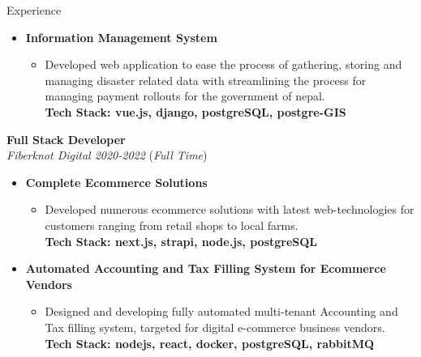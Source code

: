 \documentclass{resume} %
\begin{document}
\begin{rSection}{Experience}
    \begin{itemize}
        \item \textbf{Information Management System}
              \begin{itemize}
                  \item Developed web application to ease the process of gathering, storing and managing disaster related data with streamlining the process for managing payment rollouts for the government of nepal.
                        \\ \footnotesize{\textbf{Tech Stack: vue.js, django, postgreSQL, postgre-GIS }}
              \end{itemize}
    \end{itemize}

    \large{{\bf Full Stack Developer}}
    \\ \small{\textit{Fiberknot Digital 2020-2022}} (\small{\textit{Full Time}})
    \begin{itemize}
        \item \textbf{Complete Ecommerce Solutions}
              \begin{itemize}
                  \item Developed numerous ecommerce solutions with latest web-technologies for customers ranging from retail shops to local farms.
                        \\ \footnotesize{\textbf{Tech Stack: next.js, strapi, node.js, postgreSQL }}
              \end{itemize}
    \end{itemize}

    \begin{itemize}
        \item \textbf{Automated Accounting and Tax Filling System for Ecommerce Vendors}
              \begin{itemize}
                  \item Designed and developing fully automated multi-tenant Accounting and Tax filling system,
                        targeted for digital e-commerce business vendors.
                        \\ \footnotesize{\textbf{Tech Stack: nodejs, react, docker, postgreSQL, rabbitMQ }}
              \end{itemize}
    \end{itemize}


\end{rSection}
\end{document}
